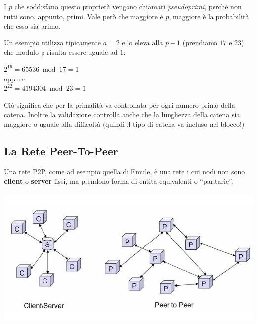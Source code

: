 \noindent I $p$ che soddisfano questo proprietà vengono chiamati \textit{pseudoprimi}, perché non tutti sono, appunto, primi. Vale però che maggiore è $p$, maggiore è la probabilità che esso sia primo. 

\noindent Un esempio utilizza tipicamente $a=2$ e lo eleva alla $p-1$ (prendiamo $17$ e $23$) che modulo p risulta essere uguale ad $1$:
\begin{center}
$2^{16}= 65536 \bmod 17 = 1$ \\
oppure \\
$2^{22}= 4194304 \bmod 23 = 1$
\end{center}

Ciò significa che per la primalità va controllata per ogni numero primo della catena. Inoltre la validazione controlla anche che la lunghezza della catena sia maggiore o uguale alla difficoltà (quindi il tipo di catena va incluso nel blocco!)

\subsection{La Rete Peer-To-Peer}
Una rete P2P, come ad esempio quella di \href{www.emule-project.net/home/perl/}{Emule}, è una rete i cui nodi non sono \textbf{client} o \textbf{server} fissi, ma prendono forma di entità equivalenti o ``paritarie''.
\begin{center}
    \includegraphics[width=\linewidth]{img/p2p}
\end{center}

